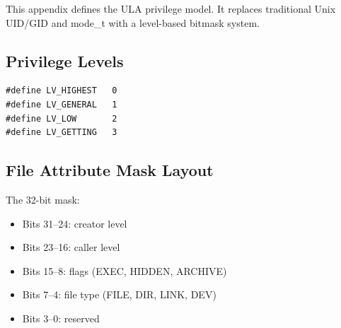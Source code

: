\documentclass[12pt,a4paper]{article}
\begin{document}
This appendix defines the ULA privilege model. It replaces traditional Unix UID/GID and mode\_t with a level-based bitmask system.

\subsection{Privilege Levels}
\begin{lstlisting}
#define LV_HIGHEST   0
#define LV_GENERAL   1
#define LV_LOW       2
#define LV_GETTING   3
\end{lstlisting}

\subsection{File Attribute Mask Layout}
The 32-bit mask:
\begin{itemize}
    \item Bits 31–24: creator level
    \item Bits 23–16: caller level
    \item Bits 15–8: flags (EXEC, HIDDEN, ARCHIVE)
    \item Bits 7–4: file type (FILE, DIR, LINK, DEV)
    \item Bits 3–0: reserved
\end{itemize}
\end{document}
